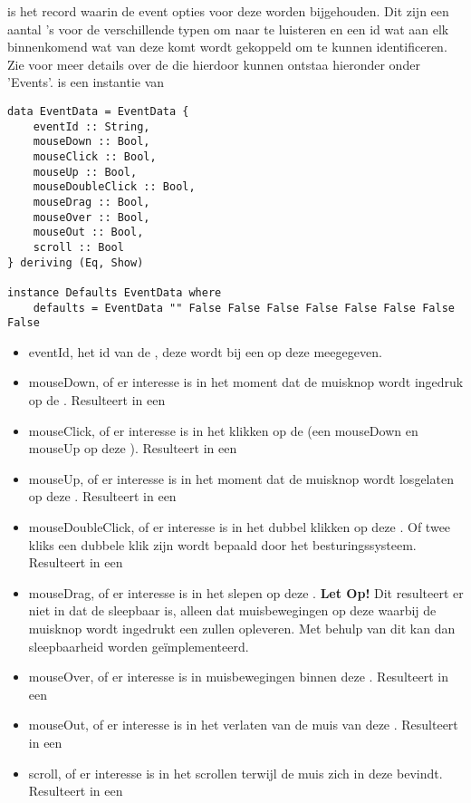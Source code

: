  is het record waarin de event opties voor deze \shape worden bijgehouden. Dit zijn een aantal 's voor de verschillende typen \events om naar te luisteren en een id wat aan elk binnenkomend  wat van deze \shape komt wordt gekoppeld om te kunnen identificeren.
Zie voor meer details over de \events die hierdoor kunnen ontstaa hieronder onder 'Events'.
 is een instantie van 

\begin{lstlisting}
data EventData = EventData {
    eventId :: String,
    mouseDown :: Bool,
    mouseClick :: Bool,
    mouseUp :: Bool,
    mouseDoubleClick :: Bool,
    mouseDrag :: Bool,
    mouseOver :: Bool,
    mouseOut :: Bool,
    scroll :: Bool
} deriving (Eq, Show)

instance Defaults EventData where
    defaults = EventData "" False False False False False False False False
\end{lstlisting} 
\begin{itemize}
	\item eventId, het id van de \shape, deze wordt bij een  op deze \shape meegegeven. 
	\item mouseDown, of er interesse is in het moment dat de muisknop wordt ingedruk op de \shape. Resulteert in een  
	\item mouseClick, of er interesse is in het klikken op de \shape (een mouseDown en mouseUp op deze \shape). Resulteert in een 
	\item mouseUp, of er interesse is in het moment dat de muisknop wordt losgelaten op deze \shape. Resulteert in een 
	\item mouseDoubleClick, of er interesse is in het dubbel klikken op deze \shape. Of twee kliks een dubbele klik zijn wordt bepaald door het besturingssysteem. Resulteert in een 
	\item mouseDrag, of er interesse is in het slepen op deze \shape. {\bf Let Op!} Dit resulteert er niet in dat de \shape sleepbaar is, alleen dat muisbewegingen op deze \shape waarbij de muisknop wordt ingedrukt een  zullen opleveren. Met behulp van dit  kan dan sleepbaarheid worden geïmplementeerd.
	\item mouseOver, of er interesse is in muisbewegingen binnen deze \shape. Resulteert in een 
	\item mouseOut, of er interesse is in het verlaten van de muis van deze \shape. Resulteert in een 
	\item scroll, of er interesse is in het scrollen terwijl de muis zich in deze \shape bevindt. Resulteert in een 	
\end{itemize}


